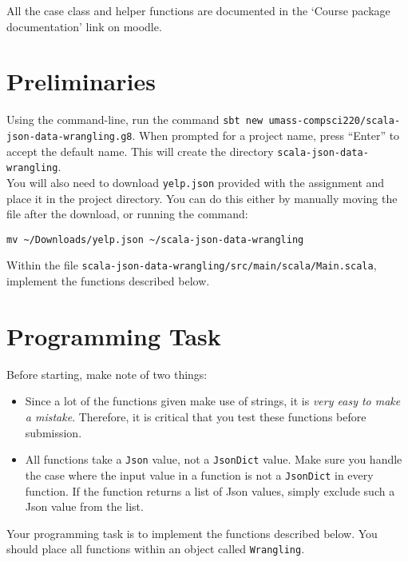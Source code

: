 \documentclass[9pt]{extbook}
\begin{document}
\noindent All the case class and helper functions are documented in the `Course
package documentation' link on moodle.

\section{Preliminaries}

Using the command-line, run the command
\verb|sbt new umass-compsci220/scala-json-data-wrangling.g8|. When prompted for
a project name, press ``Enter'' to accept the default name. This will create
the directory \verb|scala-json-data-wrangling|.
\\
\noindent You will also need to download \verb|yelp.json| provided with the
assignment and place it in the project directory. You can do this either by
manually moving the file after the download, or running the command:
\begin{verbatim}
mv ~/Downloads/yelp.json ~/scala-json-data-wrangling
\end{verbatim}

\noindent Within the file \verb|scala-json-data-wrangling/src/main/scala/Main.scala|,
implement the functions described below.

\section{Programming Task}

Before starting, make note of two things:

\begin{itemize}
\item Since a lot of the functions given make use of strings, it is
\textit{very easy to make a mistake}. Therefore, it is critical that you test
these functions before submission.

\item All functions take a \texttt{Json} value, not a \texttt{JsonDict} value.
Make sure you handle the case where the input value in a function is not
a \texttt{JsonDict} in every function. If the function returns a list of
Json values, simply exclude such a Json value from the list.
\end{itemize}

Your programming task is to implement the functions described below. You should
place all functions within an object called \texttt{Wrangling}.
\end{document}
